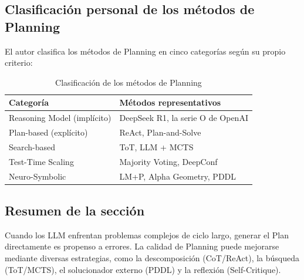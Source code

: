 \subsection{Clasificación personal de los métodos de Planning}

El autor clasifica los métodos de Planning en cinco categorías según su propio criterio:

\begin{table}[H]
\centering
\begin{tabular}{ll}
\toprule
\textbf{Categoría} & \textbf{Métodos representativos} \\
\midrule
Reasoning Model (implícito) & DeepSeek R1, la serie O de OpenAI \\
Plan-based (explícito) & ReAct, Plan-and-Solve \\
Search-based & ToT, LLM + MCTS \\
Test-Time Scaling & Majority Voting, DeepConf \\
Neuro-Symbolic & LM+P, Alpha Geometry, PDDL \\
\bottomrule
\end{tabular}
\caption{Clasificación de los métodos de Planning}
\end{table}

\subsection{Resumen de la sección}

Cuando los LLM enfrentan problemas complejos de ciclo largo, generar el Plan directamente es propenso a errores. La calidad de Planning puede mejorarse mediante diversas estrategias, como la descomposición (CoT/ReAct), la búsqueda (ToT/MCTS), el solucionador externo (PDDL) y la reflexión (Self-Critique).

